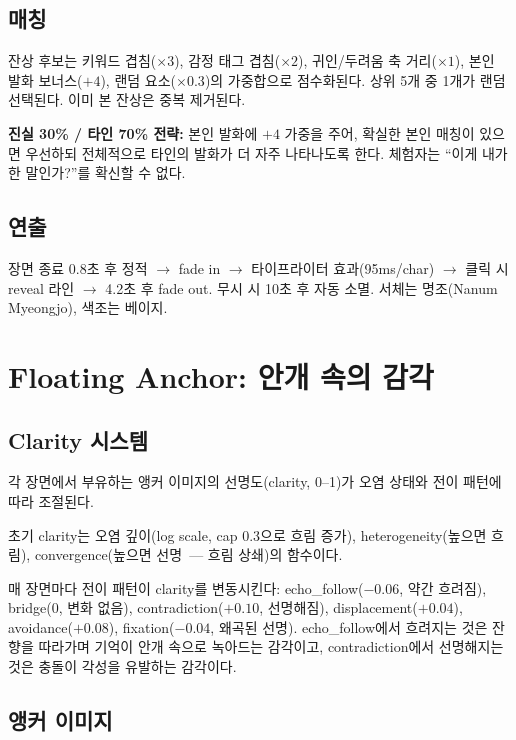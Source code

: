\documentclass[11pt, a4paper]{article}
\begin{document}
\subsection{매칭}

잔상 후보는 키워드 겹침($\times 3$), 감정 태그 겹침($\times 2$), 귀인/두려움 축 거리($\times 1$), 본인 발화 보너스($+4$), 랜덤 요소($\times 0.3$)의 가중합으로 점수화된다. 상위 5개 중 1개가 랜덤 선택된다. 이미 본 잔상은 중복 제거된다.

\textbf{진실 30\% / 타인 70\% 전략:} 본인 발화에 $+4$ 가중을 주어, 확실한 본인 매칭이 있으면 우선하되 전체적으로 타인의 발화가 더 자주 나타나도록 한다. 체험자는 ``이게 내가 한 말인가?''를 확신할 수 없다.

\subsection{연출}

장면 종료 0.8초 후 정적 $\to$ fade in $\to$ 타이프라이터 효과(95ms/char) $\to$ 클릭 시 reveal 라인 $\to$ 4.2초 후 fade out. 무시 시 10초 후 자동 소멸. 서체는 명조(Nanum Myeongjo), 색조는 베이지.


\section{Floating Anchor: 안개 속의 감각}

\subsection{Clarity 시스템}

각 장면에서 부유하는 앵커 이미지의 선명도(clarity, 0--1)가 오염 상태와 전이 패턴에 따라 조절된다.

초기 clarity는 오염 깊이(log scale, cap 0.3으로 흐림 증가), heterogeneity(높으면 흐림), convergence(높으면 선명~--- 흐림 상쇄)의 함수이다.

매 장면마다 전이 패턴이 clarity를 변동시킨다: echo\_follow($-0.06$, 약간 흐려짐), bridge($0$, 변화 없음), contradiction($+0.10$, 선명해짐), displacement($+0.04$), avoidance($+0.08$), fixation($-0.04$, 왜곡된 선명). echo\_follow에서 흐려지는 것은 잔향을 따라가며 기억이 안개 속으로 녹아드는 감각이고, contradiction에서 선명해지는 것은 충돌이 각성을 유발하는 감각이다.

\subsection{앵커 이미지}
\end{document}
